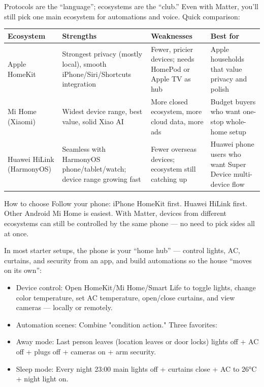 
Protocols are the “language”; ecosystems are the “club.” Even with Matter, you'll still pick one main ecosystem for automations and voice. Quick comparison:

\begin{center}
\begin{tabularx}{\linewidth}{|X|X|X|X|}
\hline
\textbf{Ecosystem} & \textbf{Strengths} & \textbf{Weaknesses} & \textbf{Best for} \tabularnewline
\hline
Apple HomeKit & Strongest privacy (mostly local), smooth iPhone/Siri/Shortcuts integration & Fewer, pricier devices; needs HomePod or Apple TV as hub & Apple households that value privacy and polish \tabularnewline
Mi Home (Xiaomi) & Widest device range, best value, solid Xiao AI & More closed ecosystem, more cloud data, more ads & Budget buyers who want one-stop whole-home setup \tabularnewline
Huawei HiLink (HarmonyOS) & Seamless with HarmonyOS phone/tablet/watch; device range growing fast & Fewer overseas devices; ecosystem still catching up & Huawei phone users who want Super Device multi-device flow \tabularnewline
\hline
\end{tabularx}
\end{center}

\begin{tcbinfo}{How to choose}
Follow your phone: iPhone HomeKit first. Huawei HiLink first. Other Android Mi Home is easiest. With Matter, devices from different ecosystems can still be controlled by the same phone — no need to pick sides all at once.

\end{tcbinfo}


In most starter setups, the phone is your “home hub” — control lights, AC, curtains, and security from an app, and build automations so the house “moves on its own”:

\begin{itemize}
  \item Device control: Open HomeKit/Mi Home/Smart Life to toggle lights, change color temperature, set AC temperature, open/close curtains, and view cameras — locally or remotely.
  \item Automation scenes: Combine "condition action." Three favorites:
  \item Away mode: Last person leaves (location leaves or door locks) lights off + AC off + plugs off + cameras on + arm security.
  \item Sleep mode: Every night 23:00 main lights off + curtains close + AC to 26°C + night light on.
\end{itemize}

